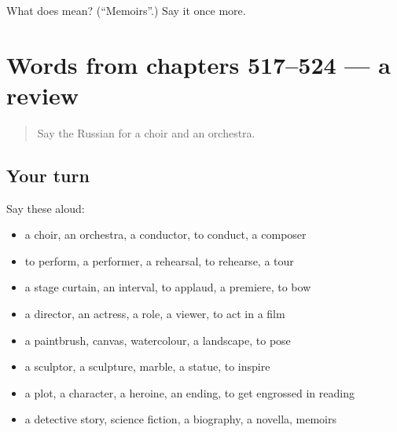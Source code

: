 \begin{tcolorbox}[breakable,colback=teal!4,colframe=teal!35!black,title={Before you move on}]
What does  mean? (\textquotedblleft{}Memoirs\textquotedblright{}.) Say it once more.
\end{tcolorbox}
\section[(dialogue)]{Words from chapters 517–524 — a review}

\label{lesson:RU-R524-review-517-524}



\begin{quote}
Say the Russian for a choir and an orchestra.
\end{quote}

\subsection*{Your turn}
Say these aloud:

\begin{itemize}
\raggedright
  \item a choir, an orchestra, a conductor, to conduct, a composer
  \item to perform, a performer, a rehearsal, to rehearse, a tour
  \item a stage curtain, an interval, to applaud, a premiere, to bow
  \item a director, an actress, a role, a viewer, to act in a film
  \item a paintbrush, canvas, watercolour, a landscape, to pose
  \item a sculptor, a sculpture, marble, a statue, to inspire
  \item a plot, a character, a heroine, an ending, to get engrossed in reading
  \item a detective story, science fiction, a biography, a novella, memoirs
\end{itemize}

